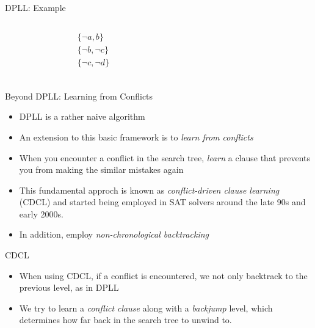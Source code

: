 \documentclass{beamer}
\begin{document}
\begin{frame}{DPLL: Example}
    \begin{columns}
        \begin{column}{0.45\textwidth}
            \begin{align*}
                &\{\neg a,b\}\\
                &\{\neg b,\neg c\}\\
                &\{\neg c,\neg d\}\\
            \end{align*}
        \end{column}

        \begin{column}{0.45\textwidth}
            
        \end{column}
    \end{columns}
\end{frame}

\begin{frame}{Beyond DPLL: Learning from Conflicts}
    \begin{itemize}[<+->]
        \item DPLL is a rather naive algorithm
        \item An extension to this basic framework is to \textit{learn from conflicts} 
        \item When you encounter a conflict in the search tree, \textit{learn} a clause that prevents you from making the similar mistakes again
        \item This fundamental approch is known as \textit{conflict-driven clause learning} (CDCL) and started being employed in SAT solvers around the late 90s and early 2000s.
        \item In addition, employ \textit{non-chronological backtracking}
    \end{itemize}
\end{frame}

\begin{frame}{CDCL}
\begin{itemize}
    \item When using CDCL, if a conflict is encountered, we not only backtrack to the previous level, as in DPLL
    \item We try to learn a \textit{conflict clause} along with a \textit{backjump} level, which determines how far back in the search tree to unwind to.
\end{itemize}
\end{frame}
\end{document}
